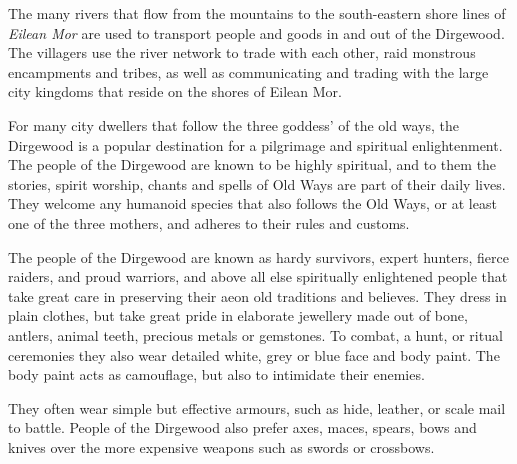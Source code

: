 The many rivers that flow from the mountains to the south-eastern shore lines of
\emph{Eilean Mor} are used to transport people and goods in and out of the
Dirgewood. The villagers use the river network to trade with each other, raid
monstrous encampments and tribes, as well as communicating and trading with
the large city kingdoms that reside on the shores of Eilean Mor.

For many city dwellers that follow the three goddess' of the old ways, the
Dirgewood is a popular destination for a pilgrimage and spiritual
enlightenment. The people of the Dirgewood are known to be highly spiritual,
and to them the stories, spirit worship, chants and spells of Old Ways are
part of their daily lives. They welcome any humanoid species that also follows
the Old Ways, or at least one of the three mothers, and adheres to their rules
and customs.

The people of the Dirgewood are known as hardy survivors, expert hunters,
fierce raiders, and proud warriors, and above all else spiritually enlightened
people that take great care in preserving their aeon old traditions and
believes. They dress in plain clothes, but take great pride in elaborate
jewellery made out of bone, antlers, animal teeth, precious metals or
gemstones. To combat, a hunt, or ritual ceremonies they also wear detailed
white, grey or blue face and body paint. The body paint acts as camouflage,
but also to intimidate their enemies.

They often wear simple but effective armours, such as hide, leather, or
scale mail to battle. People of the Dirgewood also prefer axes, maces,
spears, bows and knives over the more expensive weapons such as swords or
crossbows.

